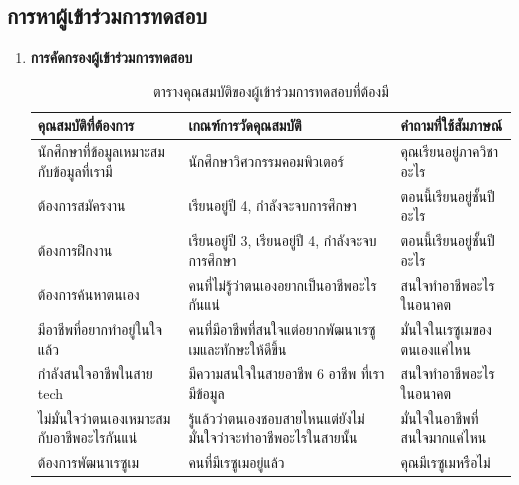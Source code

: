 \subsection{การหาผู้เข้าร่วมการทดสอบ}
\begin{enumerate}
    \item \textbf{การคัดกรองผู้เข้าร่วมการทดสอบ}
          \begin{table}[H]
              \caption{ตารางคุณสมบัติของผู้เข้าร่วมการทดสอบที่ต้องมี}
              \label{tab:my-table}
              \begin{tabularx}{\textwidth}{|X|X|X|}
                  \hline
                  \textbf{คุณสมบัติที่ต้องการ}             & \textbf{เกณฑ์การวัดคุณสมบัติ}                           & \textbf{คำถามที่ใช้สัมภาษณ์}   \\ \hline
                  นักศึกษาที่ข้อมูลเหมาะสมกับข้อมูลที่เรามี      & นักศึกษาวิศวกรรมคอมพิวเตอร์                             & คุณเรียนอยู่ภาควิชาอะไร       \\ \hline
                  ต้องการสมัครงาน                      & เรียนอยู่ปี 4, กำลังจะจบการศึกษา                          & ตอนนี้เรียนอยู่ชั้นปีอะไร        \\ \hline
                  ต้องการฝึกงาน                        & เรียนอยู่ปี 3, เรียนอยู่ปี 4, กำลังจะจบการศึกษา               & ตอนนี้เรียนอยู่ชั้นปีอะไร        \\ \hline
                  ต้องการค้นหาตนเอง                    & คนที่ไม่รู้ว่าตนเองอยากเป็นอาชีพอะไรกันแน่                   & สนใจทำอาชีพอะไรในอนาคต     \\ \hline
                  มีอาชีพที่อยากทำอยู่ในใจแล้ว               & คนที่มีอาชีพที่สนใจแต่อยากพัฒนาเรซูเมและทักษะให้ดีขึ้น           & มั่นใจในเรซูเมของตนเองแค่ไหน \\ \hline
                  กำลังสนใจอาชีพในสาย tech              & มีความสนใจในสายอาชีพ 6 อาชีพ ที่เรามีข้อมูล                & สนใจทำอาชีพอะไรในอนาคต     \\ \hline
                  ไม่มั่นใจว่าตนเองเหมาะสมกับอาชีพอะไรกันแน่ & รู้แล้วว่าตนเองชอบสายไหนแต่ยังไม่มั่นใจว่าจะทำอาชีพอะไรในสายนั้น & มั่นใจในอาชีพที่สนใจมากแค่ไหน  \\ \hline
                  ต้องการพัฒนาเรซูเม                    & คนที่มีเรซูเมอยู่แล้ว                                     & คุณมีเรซูเมหรือไม่            \\ \hline

\end{tabularx}
\end{table}
\end{enumerate}
